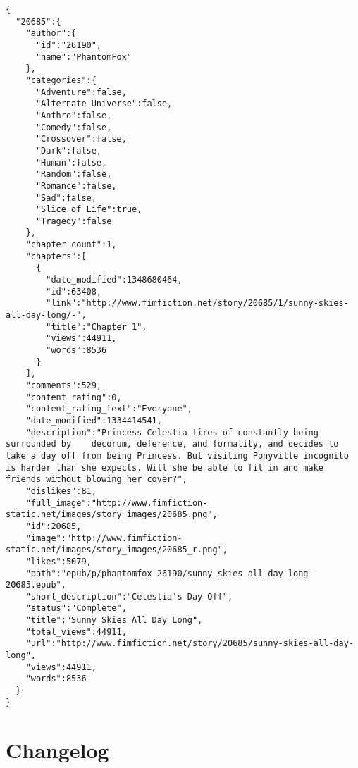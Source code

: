 \documentclass[hidelinks,a4paper,12pt]{article}
\begin{document}
\begin{lstlisting}[breaklines, basicstyle=\ttfamily\small, columns=flexible]
{
  "20685":{
    "author":{
      "id":"26190",
      "name":"PhantomFox"
    },
    "categories":{
      "Adventure":false,
      "Alternate Universe":false,
      "Anthro":false,
      "Comedy":false,
      "Crossover":false,
      "Dark":false,
      "Human":false,
      "Random":false,
      "Romance":false,
      "Sad":false,
      "Slice of Life":true,
      "Tragedy":false
    },
    "chapter_count":1,
    "chapters":[
      {
        "date_modified":1348680464,
        "id":63408,
        "link":"http://www.fimfiction.net/story/20685/1/sunny-skies-all-day-long/-",
        "title":"Chapter 1",
        "views":44911,
        "words":8536
      }
    ],
    "comments":529,
    "content_rating":0,
    "content_rating_text":"Everyone",
    "date_modified":1334414541,
    "description":"Princess Celestia tires of constantly being surrounded by 	decorum, deference, and formality, and decides to take a day off from being Princess. But visiting Ponyville incognito is harder than she expects. Will she be able to fit in and make friends without blowing her cover?",
    "dislikes":81,
    "full_image":"http://www.fimfiction-static.net/images/story_images/20685.png",
    "id":20685,
    "image":"http://www.fimfiction-static.net/images/story_images/20685_r.png",
    "likes":5079,
    "path":"epub/p/phantomfox-26190/sunny_skies_all_day_long-20685.epub",
    "short_description":"Celestia's Day Off",
    "status":"Complete",
    "title":"Sunny Skies All Day Long",
    "total_views":44911,
    "url":"http://www.fimfiction.net/story/20685/sunny-skies-all-day-long",
    "views":44911,
    "words":8536
  }
}
\end{lstlisting}


\section{Changelog} \label{sec:changelog}
\end{document}
